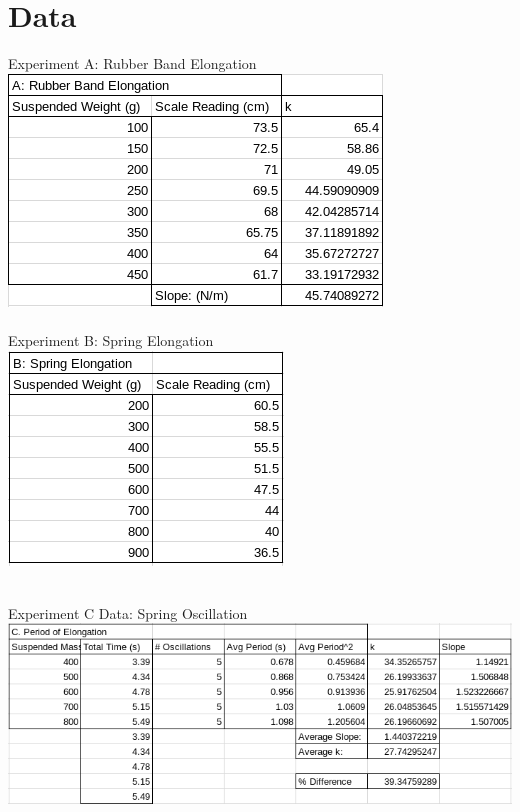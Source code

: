 \documentclass[12pt]{article}
\begin{document}
    \section{Data}
        {\large Experiment A: Rubber Band Elongation} \\
        \includegraphics[scale=0.75 ]{LazyChartA.png} \\ \\
        {\large Experiment B: Spring Elongation} \\
        \includegraphics[scale=0.75]{LazyChartB.png} \\ \\ 
        \begin{minipage}{\linewidth} %
            {\large Experiment C Data: Spring Oscillation} \\ 
            \includegraphics[scale=0.75]{LazyChartC.png} \\ \\
        \end{minipage}
\end{document}
